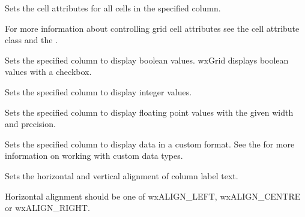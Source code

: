 \label{wxgridsetcolattr}


Sets the cell attributes for all cells in the specified column.

For more information about controlling grid cell attributes see the
 cell attribute class and the
.



\label{wxgridsetcolformatbool}


Sets the specified column to display boolean values. wxGrid displays boolean values with a checkbox.



\label{wxgridsetcolformatnumber}


Sets the specified column to display integer values.



\label{wxgridsetcolformatfloat}


Sets the specified column to display floating point values with the given width and precision.



\label{wxgridsetcolformatcustom}


Sets the specified column to display data in a custom format.
See the  for more information on working
with custom data types.



\label{wxgridsetcollabelalignment}


Sets the horizontal and vertical alignment of column label text.

Horizontal alignment should be one of wxALIGN\_LEFT, wxALIGN\_CENTRE or wxALIGN\_RIGHT.

